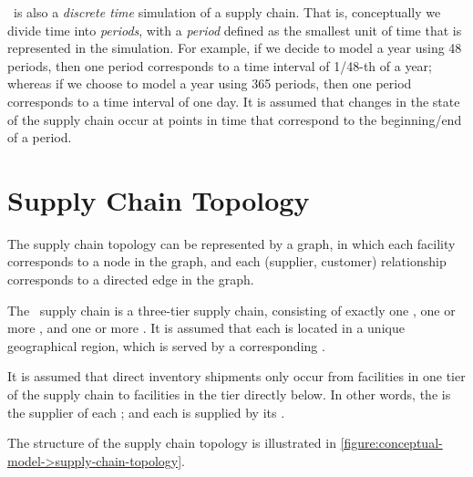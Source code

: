 \scs\ is also a \emph{discrete time} simulation of a supply chain.
That is, conceptually we divide time into \emph{periods},
with a \emph{period} defined as the smallest unit of time
that is represented in the simulation.
For example, if we decide to model a year using 48 periods,
then one period corresponds to a time interval of 1/48-th of a year;
whereas if we choose to model a year using 365 periods,
then one period corresponds to a time interval of one day.
It is assumed that changes in the state of the supply chain
occur at points in time that correspond to the beginning/end of a period.





\section{Supply Chain Topology}
\label{section:conceptual-model->supply-chain-topology}

The supply chain topology can be represented by a graph,
in which each facility corresponds to a node in the graph,
and each (supplier, customer) relationship corresponds to
a directed edge in the graph.

The \scs\ supply chain is a three-tier supply chain,
consisting of exactly one ,
one or more ,
and one or more .
It is assumed that each 
is located in a unique geographical region,
which is served by a corresponding .

It is assumed that direct inventory shipments only occur
from facilities in one tier of the supply chain
to facilities in the tier directly below.
In other words,
the 
is the supplier of each ;
and each 
is supplied by its .

The structure of the supply chain topology is illustrated in 
\autoref{figure:conceptual-model->supply-chain-topology}.

